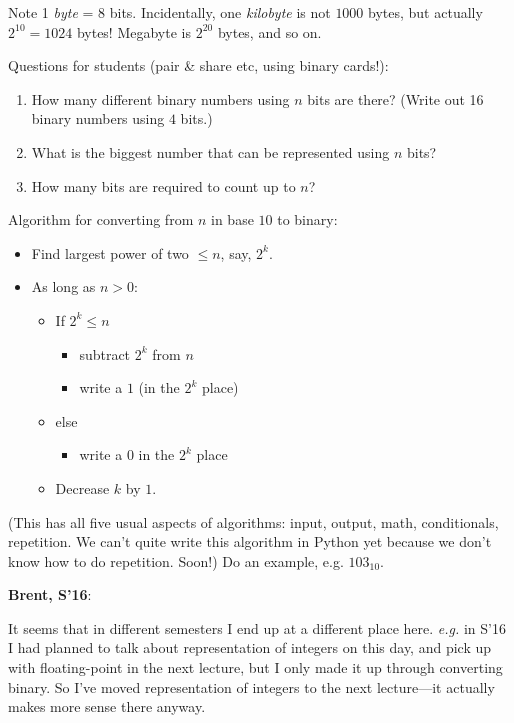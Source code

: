 \documentclass{article}
\newenvironment{reflect}[1]
{
  \begin{lrbox}{\reflectbox}
    \begin{minipage}[t]{\textwidth}
      \textbf{#1}:
}{
    \end{minipage}
  \end{lrbox}
  \fbox{\usebox{\reflectbox}}
}
\begin{document}
Note 1 \emph{byte} = 8 bits.  Incidentally, one \emph{kilobyte} is not
$1000$ bytes, but actually $2^{10} = 1024$ bytes!  Megabyte is
$2^{20}$ bytes, and so on.

Questions for students (pair \& share etc, using binary cards!):
\begin{enumerate}
\item How many different binary numbers using $n$ bits are there?
  (Write out 16 binary numbers using $4$ bits.)
\item What is the biggest number that can be represented using $n$
  bits?
\item How many bits are required to count up to $n$?
\end{enumerate}

Algorithm for converting from $n$ in base $10$ to binary:
\begin{itemize}
\item Find largest power of two $\leq n$, say, $2^k$.
\item As long as $n > 0$:
  \begin{itemize}
  \item If $2^k \leq n$
    \begin{itemize}
    \item subtract $2^k$ from $n$
    \item write a $1$ (in the $2^k$ place)
    \end{itemize}
  \item else
    \begin{itemize}
    \item  write a $0$ in the $2^k$ place
    \end{itemize}
  \item Decrease $k$ by $1$.
  \end{itemize}
\end{itemize}

(This has all five usual aspects of algorithms: input, output, math,
conditionals, repetition.  We can't quite write this algorithm in
Python yet because we don't know how to do repetition.  Soon!)  Do an
example, e.g. $103_{10}$.

\begin{reflect}{Brent, S'16}
  It seems that in different semesters I end up at a different place
  here. \emph{e.g.} in S'16 I had planned to talk about representation
  of integers on this day, and pick up with floating-point in the next
  lecture, but I only made it up through converting binary. So I've moved
  representation of integers to the next lecture---it actually makes
  more sense there anyway.
\end{reflect}
\end{document}
